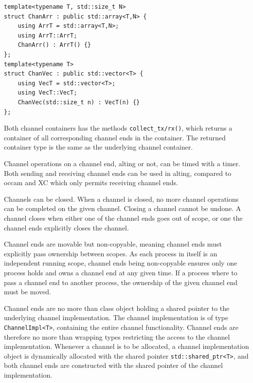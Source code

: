 \begin{lstfloat}
\begin{lstlisting}[caption={Channel container types.}, label={lst:channel_container_types}, style={CustomC++}, xleftmargin={2em}]
template<typename T, std::size_t N>
struct ChanArr : public std::array<T,N> {
    using ArrT = std::array<T,N>;
    using ArrT::ArrT;
    ChanArr() : ArrT() {}
};
template<typename T>
struct ChanVec : public std::vector<T> {
    using VecT = std::vector<T>;
    using VecT::VecT;
    ChanVec(std::size_t n) : VecT(n) {}
};
\end{lstlisting}
\end{lstfloat}

Both channel containers has the methods \lstinline[style={CustomC++}]|collect_tx/rx()|, which returns a container of all corresponding channel ends in the container. The returned container type is the same as the underlying channel container.

Channel operations on a channel end, alting or not, can be timed with a timer. Both sending and receiving channel ends can be used in alting, compared to occam and XC which only permits receiving channel ends.

Channels can be closed. When a channel is closed, no more channel operations can be completed on the given channel. Closing a channel cannot be undone. A channel closes when either one of the channel ends goes out of scope, or one the channel ends explicitly closes the channel.

Channel ends are movable but non\hyp{}copyable, meaning channel ends must explicitly pass ownership between scopes. As each process in itself is an independent running scope, channel ends being non\hyp{}copyable ensures only one process holds and owns a channel end at any given time. If a process where to pass a channel end to another process, the ownership of the given channel end must be moved.

Channel ends are no more than class object holding a shared pointer to the underlying channel implementation. The channel implementation is of type \lstinline[style={CustomC++}]|ChannelImpl<T>|, containing the entire channel functionality. Channel ends are therefore no more than wrapping types restricting the access to the channel implementation. Whenever a channel is to be allocated, a channel implementation object is dynamically allocated with the shared pointer \lstinline[style={CustomC++}]|std::shared_ptr<T>|, and both channel ends are constructed with the shared pointer of the channel implementation.

